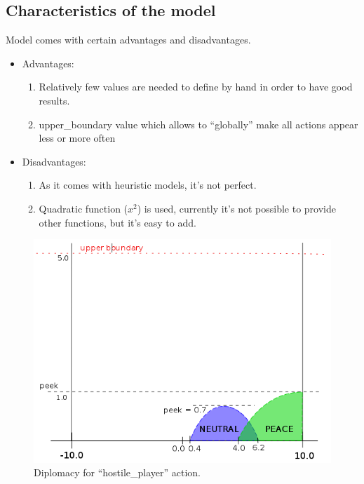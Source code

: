\subsection{Characteristics of the model}
	Model comes with certain advantages and disadvantages.
	\begin{itemize}
		\item Advantages:
			\begin{enumerate}
				\item Relatively few values are needed to define by hand in order to have good results.
				\item upper\_boundary value which allows to ``globally'' make all actions appear less or more often
			\end{enumerate}
		\item Disadvantages:
			\begin{enumerate}
				\item As it comes with heuristic models, it's not perfect.
				\item Quadratic function ($x^{2}$) is used, currently it's not possible to provide other functions, but it's easy to add.
			\end{enumerate}
	\end{itemize}

\begin{figure}[h!]
	\centering
	\includegraphics[width=\textwidth]{gfx/diplomacy2.png}
	\caption{Diplomacy for ``hostile\_player'' action.}
	\label{fig:diplomacy2}
\end{figure}

